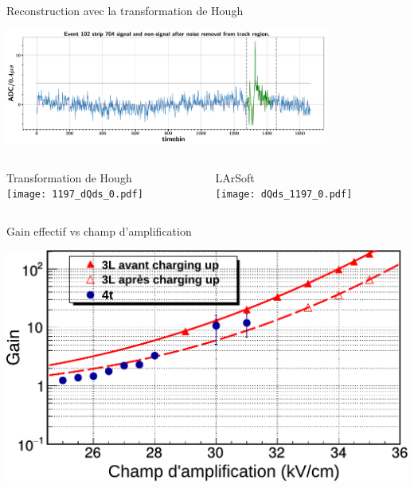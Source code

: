     \begin{frame}{Reconstruction avec la transformation de Hough}
        \begin{scriptsize}
            \begin{center} \includegraphics[width=0.8\textwidth]{./pictures/cnsub_fromtrack.pdf} \end{center}
            \begin{columns}
                \begin{column}{0.6\textwidth}
                    Transformation de Hough\\
                    \texttt{[image: 1197\_dQds\_0.pdf]}
                \end{column}
                \begin{column}{0.4\textwidth}
                    LArSoft\\
                    \texttt{[image: dQds\_1197\_0.pdf]}
                \end{column}
            \end{columns}
        \end{scriptsize}
    \end{frame}
    
    \begin{frame}{Gain effectif vs champ d'amplification}
        \begin{scriptsize}
            \centering \includegraphics[width=\textwidth]{./pictures/gain_vs_ampli_full.pdf} \\ 
        \end{scriptsize}
    \end{frame}
    
